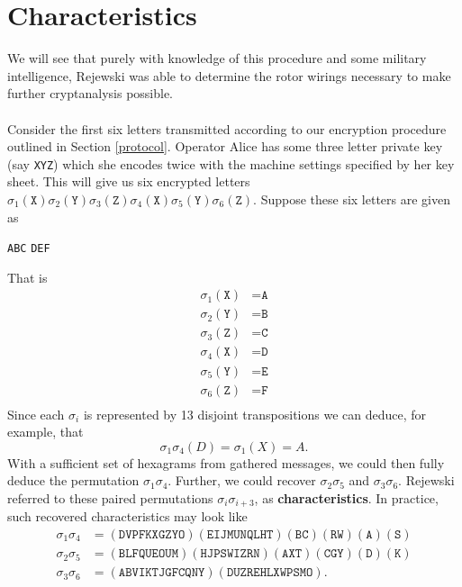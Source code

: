 \section{Characteristics}
We will see that purely with knowledge of this procedure and some
military intelligence, Rejewski was able to determine the rotor
wirings necessary to make further cryptanalysis possible.
\\\\Consider the first six letters transmitted according to our
encryption procedure outlined in Section \ref{protocol}. Operator Alice has
some three letter private
key (say \texttt{XYZ}) which she encodes twice with the machine
settings specified by her key sheet. This will give us six encrypted
letters
$\sigma_1(\texttt{X})\sigma_2(\texttt{Y})\sigma_3(\texttt{Z})\sigma_4(\texttt{X})\sigma_5(\texttt{Y})\sigma_6(\texttt{Z})$.
Suppose these six letters are given as
\begin{center}
  \texttt{ABC} \texttt{DEF}
\end{center}
That is
\begin{align*}
  \sigma_1(\texttt{X}) & = \texttt{A} \\
  \sigma_2(\texttt{Y}) & = \texttt{B} \\
  \sigma_3(\texttt{Z}) & = \texttt{C} \\
  \sigma_4(\texttt{X}) & = \texttt{D} \\
  \sigma_5(\texttt{Y}) & = \texttt{E} \\
  \sigma_6(\texttt{Z}) & = \texttt{F} \\
\end{align*}
Since each $\sigma_i$ is represented by 13 disjoint transpositions we
can deduce, for example, that
\[
  \sigma_1\sigma_4(D) = \sigma_1(X) = A.
\]
With a sufficient set of hexagrams from gathered messages, we could
then fully deduce the permutation $\sigma_1\sigma_4$. Further, we
could recover $\sigma_2\sigma_5$ and $\sigma_3\sigma_6$. Rejewski
referred to these paired permutations $\sigma_i\sigma_{i+3}$, as
{\bf{characteristics}}. In
practice, such recovered characteristics may look like
\begin{align*}
  \sigma_1\sigma_4 & =
  (\texttt{DVPFKXGZYO})(\texttt{EIJMUNQLHT})(\texttt{BC})(\texttt{RW})(\texttt{A})(\texttt{S})
  \\
  \sigma_2\sigma_5 & =
  (\texttt{BLFQUEOUM})(\texttt{HJPSWIZRN})(\texttt{AXT})(\texttt{CGY})(\texttt{D})(\texttt{K})
  \\
  \sigma_3\sigma_6 & = (\texttt{ABVIKTJGFCQNY})(\texttt{DUZREHLXWPSMO}).
\end{align*}
